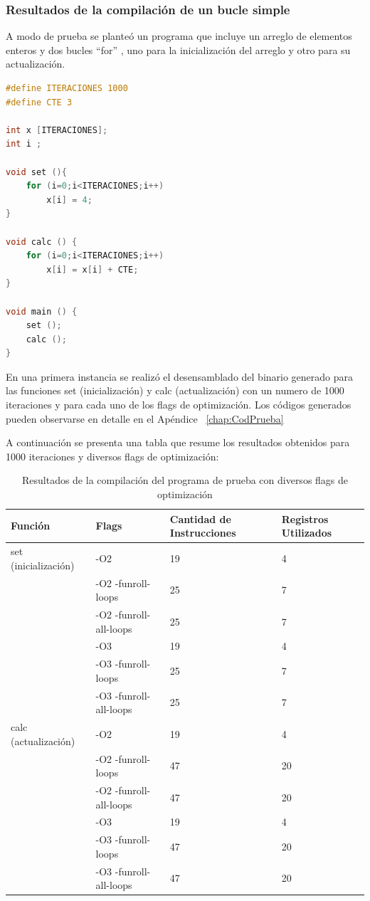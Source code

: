 		\subsubsection{Resultados de la compilación de un bucle simple}

A modo de prueba se planteó un programa que incluye un arreglo de elementos enteros y dos bucles ``for'' , uno para la inicialización del arreglo y
otro para su actualización.

	\begin{lstlisting}[language=C,frame=single]
#define ITERACIONES 1000
#define CTE 3

int x [ITERACIONES];
int i ;

void set (){
	for (i=0;i<ITERACIONES;i++)
		x[i] = 4;
}

void calc () {
	for (i=0;i<ITERACIONES;i++)
		x[i] = x[i] + CTE;
}

void main () {
	set ();
	calc ();
}
	\end{lstlisting}
		
En una primera instancia se realizó el desensamblado del binario generado para las funciones set (inicialización) y calc (actualización) con un
numero de 1000 iteraciones y para cada uno de los flags de optimización. Los códigos generados pueden observarse en detalle en el Apéndice
~\ref{chap:CodPrueba} 

A continuación se presenta una tabla que resume los resultados obtenidos para 1000 iteraciones y diversos flags de optimización:

\begin{table}[h!]
		\centering
		\begin{tabular}{ | p{4cm} | p{5cm} | p{2.5cm} | p{2cm} | }
		\hline 
		\rowcolor[gray]{0.8} Función & Flags & Cantidad de Instrucciones  & Registros Utilizados \\    
		\hline 
		set (inicialización) 	& -O2 						& 19 &  4 \\ 
		\hline 
							 	& -O2 -funroll-loops 		& 25 &  7 \\ 
		\hline 
							 	& -O2 -funroll-all-loops 	& 25 &  7 \\ 
		\hline 
							 	& -O3 						& 19 &  4 \\ 
		\hline 
							 	& -O3 -funroll-loops 		& 25 &  7 \\ 
		\hline 
							 	& -O3 -funroll-all-loops 	& 25 &  7 \\ 
		\hline 
		calc (actualización) 	& -O2						& 19 &  4 \\ 
		\hline 
							 	& -O2 -funroll-loops 		& 47 &  20 \\ 
		\hline 
							 	& -O2 -funroll-all-loops 	& 47 &  20 \\ 		
		\hline					 	
							 	& -O3 						& 19 &  4 \\ 
		\hline 
							 	& -O3 -funroll-loops 		& 47 &  20 \\ 
		\hline 
							 	& -O3 -funroll-all-loops 	& 47 &  20 \\ 		
		\hline 
		\end{tabular}
\caption{Resultados de la compilación del programa de prueba con diversos flags de optimización}
\end{table}	



